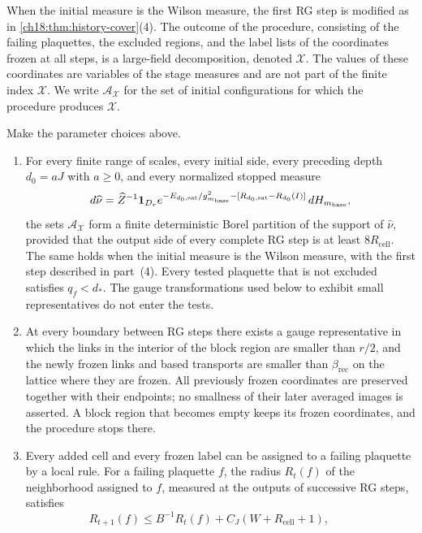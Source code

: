 \begin{definition}
\begin{enumerate}
\end{enumerate}
When the initial measure is the Wilson measure, the first RG step is modified as in \cref{ch18:thm:history-cover}(4). The outcome of the procedure, consisting of the failing plaquettes, the excluded regions, and the label lists of the coordinates frozen at all steps, is a large-field decomposition, denoted $\mathcal X$. The values of these coordinates are variables of the stage measures and are not part of the finite index $\mathcal X$. We write $\mathcal A_{\mathcal X}$ for the set of initial configurations for which the procedure produces $\mathcal X$.
\end{definition}

\begin{theorem}\label{ch18:thm:history-cover}
Make the parameter choices above.
\begin{enumerate}
\item For every finite range of scales, every initial side, every preceding depth $d_0=aJ$ with $a\ge0$, and every normalized stopped measure
\[
 d\widehat\nu=\widehat Z^{-1}\mathbf 1_{D_r}
       e^{-E_{d_0,\mathrm{sat}}/g_{m_{\mathrm{base}}}^2
                       -[R_{d_0,\mathrm{sat}}-R_{d_0}(I)]}
                         \,dH_{m_{\mathrm{base}}},
\]
the sets $\mathcal A_{\mathcal X}$ form a finite deterministic Borel partition of the support of $\widehat\nu$, provided that the output side of every complete RG step is at least $8R_{\mathrm{cell}}$. The same holds when the initial measure is the Wilson measure, with the first step described in part~(4). Every tested plaquette that is not excluded satisfies $q_f<d_*$. The gauge transformations used below to exhibit small representatives do not enter the tests.
\item At every boundary between RG steps there exists a gauge representative in which the links in the interior of the block region are smaller than $r/2$, and the newly frozen links and based transports are smaller than $\beta_{\mathrm{rec}}$ on the lattice where they are frozen. All previously frozen coordinates are preserved together with their endpoints; no smallness of their later averaged images is asserted. A block region that becomes empty keeps its frozen coordinates, and the procedure stops there.
\item Every added cell and every frozen label can be assigned to a failing plaquette by a local rule. For a failing plaquette $f$, the radius $R_t(f)$ of the neighborhood assigned to $f$, measured at the outputs of successive RG steps, satisfies
\[
 R_{t+1}(f)\le B^{-1}R_t(f)+C_J(W+R_{\mathrm{cell}}+1),\qquad
\]
\end{enumerate}
\end{theorem}

